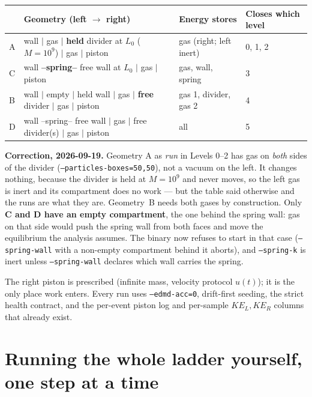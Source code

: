 \documentclass[11pt,a4paper]{article}
\newcommand{\cmd}[1]{\texttt{\footnotesize #1}}
\begin{document}
\begin{center}
\small
\begin{tabular}{@{}lp{6.0cm}p{2.5cm}p{5.0cm}@{}}
\toprule
 & Geometry (left $\to$ right) & Energy stores & Closes which level \\
\midrule
A & wall $|$ gas $|$ \textbf{held} divider at $L_0$ ($M = 10^9$) $|$ gas $|$ piston & gas (right; left inert) & 0, 1, 2 \\
C & wall \textbf{--spring--} free wall at $L_0$ $|$ gas $|$ piston & gas, wall, spring & 3 \\
B & wall $|$ empty $|$ held wall $|$ gas $|$ \textbf{free} divider $|$ gas $|$ piston & gas 1, divider, gas 2 & 4 \\
D & wall --spring-- free wall $|$ gas $|$ free divider(s) $|$ gas $|$ piston & all & 5 \\
\bottomrule
\end{tabular}
\end{center}

\textbf{Correction, 2026-09-19.} Geometry A as \emph{run} in Levels 0--2 has gas on \emph{both} sides
of the divider (\cmd{--particles-boxes=50,50}), not a vacuum on the left. It changes nothing, because
the divider is held at $M = 10^9$ and never moves, so the left gas is inert and its compartment does
no work --- but the table said otherwise and the runs are what they are. Geometry~B needs both gases
by construction. Only \textbf{C and D have an empty compartment}, the one behind the spring wall:
gas on that side would push the spring wall from both faces and move the equilibrium the analysis
assumes. The binary now refuses to start in that case (\cmd{--spring-wall} with a non-empty
compartment behind it aborts), and \cmd{--spring-k} is inert unless \cmd{--spring-wall} declares
which wall carries the spring.

\begin{center}
\end{center}
The right piston is prescribed (infinite mass, velocity protocol $u(t)$); it is the only place work enters. Every run uses \texttt{--edmd-acc=0}, drift-first seeding, the strict health contract, and the per-event piston log and per-sample $KE_{L},KE_{R}$ columns that already exist.

\section{Running the whole ladder yourself, one step at a time}\label{sec:runall}
\end{document}
